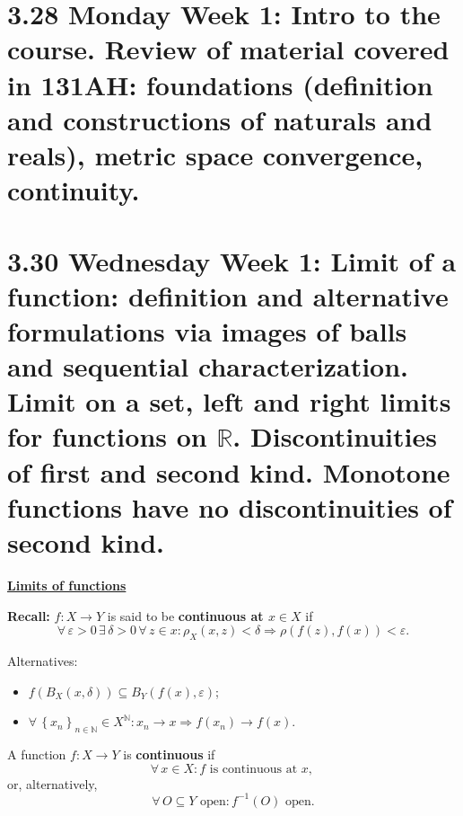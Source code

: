 \documentclass{notes}
\begin{document}
  \section{3.28 Monday Week 1: Intro to the course. Review of material covered in 131AH: foundations (definition and constructions of naturals and reals), metric space convergence, continuity.}
  
  \section{3.30 Wednesday Week 1: Limit of a function: definition and alternative formulations via images of balls and sequential characterization. Limit on a set, left and right limits for functions on \texorpdfstring{$\mathbb R$}{R}. Discontinuities of first and second kind. Monotone functions have no discontinuities of second kind.}
  
  \underline{{\boldmath \bfseries Limits of functions}}
  
  {\boldmath \bfseries Recall:} $f \colon X \to Y$ is said to be {\boldmath \bfseries continuous at $x \in X$} if 
  \[
    \forall \, \varepsilon > 0 \, \exists \, \delta > 0 \, \forall \, z \in x: \rho_X(x, z) < \delta \Rightarrow \rho(f(z), f(x)) < \varepsilon.
  \]

  Alternatives:
  \begin{itemize}
    \item $f(B_X(x, \delta)) \subseteq B_Y(f(x), \varepsilon)$; 
    \item $\forall \, \left \{ x_n \right \}_{n \in \mathbb N} \in X^\mathbb N: x_n \to x \Rightarrow f(x_n) \to f(x)$.
  \end{itemize}
  
  A function $f \colon X \to Y$ is {\boldmath \bfseries continuous} if 
  \[
    \forall \, x \in X: \text{$f$ is continuous at $x$, }
  \]
  or, alternatively,  
  \[
    \forall \, O \subseteq Y \text{ open}: f^{-1}(O) \text{ open.}
  \]
\end{document}

